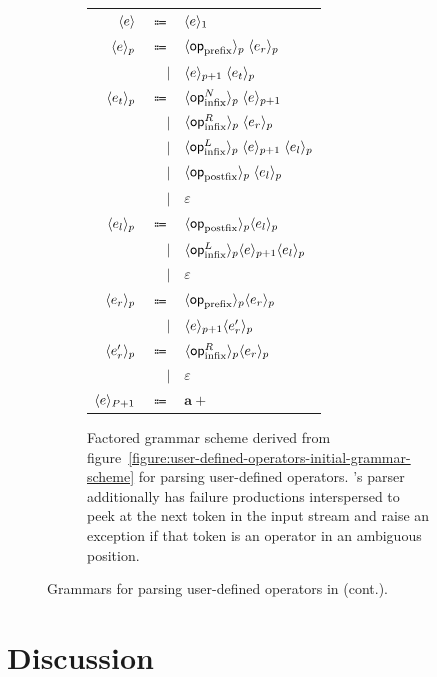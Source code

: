 \begin{figure}\ContinuedFloat
\begin{subfigure}{\linewidth}
\centering
\begin{tabular}{rrl}
$ \langle e\rangle $ & $ \Coloneqq $ & $ \langle e\rangle_1 $\\
$ \langle e\rangle_p $ & $ \Coloneqq $ & $ \langle\mathsf{op}_{\text{prefix}}\rangle_p \; \langle e_r\rangle_p $\\
& $ \mid $ & $ \langle e\rangle_{p + 1} \; \langle e_t\rangle_p $\\
$ \langle e_t\rangle_p $ & $ \Coloneqq $ & $ \langle\mathsf{op}_{\text{infix}}^N\rangle_p \; \langle e\rangle_{p + 1} $\\
& $ \mid $ & $ \langle\mathsf{op}_{\text{infix}}^R\rangle_p \; \langle e_r\rangle_p $\\
& $ \mid $ & $ \langle\mathsf{op}_{\text{infix}}^L\rangle_p \; \langle e\rangle_{p + 1} \; \langle e_l\rangle_p $\\
& $ \mid $ & $ \langle\mathsf{op}_{\text{postfix}}\rangle_p \; \langle e_l\rangle_p $\\
& $ \mid $ & $ \varepsilon $\\
$ \langle e_l\rangle_p $ & $ \Coloneqq $ & $ \langle\mathsf{op}_{\text{postfix}}\rangle_p \langle e_l\rangle_p $\\
& $ \mid $ & $ \langle\mathsf{op}_{\text{infix}}^L\rangle_p \langle e\rangle_{p + 1} \langle e_l\rangle_p $\\
& $ \mid $ & $ \varepsilon $\\
$ \langle e_r\rangle_p $ & $ \Coloneqq $ & $ \langle\mathsf{op}_{\text{prefix}}\rangle_p \langle e_r\rangle_p $\\
& $ \mid $ & $ \langle e\rangle_{p + 1} \langle e_r'\rangle_p $\\
$ \langle e_r'\rangle_p $ & $ \Coloneqq $ & $ \langle\mathsf{op}_{\text{infix}}^R\rangle_p \langle e_r\rangle_p $\\
& $ \mid $ & $ \varepsilon $\\
$ \langle e\rangle_{P + 1} $ & $ \Coloneqq $ & $ \mathbf{a}+ $
\end{tabular}
\caption{Factored grammar scheme derived from figure~\ref{figure:user-defined-operators-initial-grammar-scheme} for parsing user-defined operators.
\Beluga's parser additionally has failure productions interspersed to peek at the next token in the input stream and raise an exception if that token is an operator in an ambiguous position.}
\label{figure:user-defined-operators-final-grammar-scheme}
\end{subfigure}
\caption[]{Grammars for parsing user-defined operators in \Beluga (cont.).}
\end{figure}

\section{Discussion}

